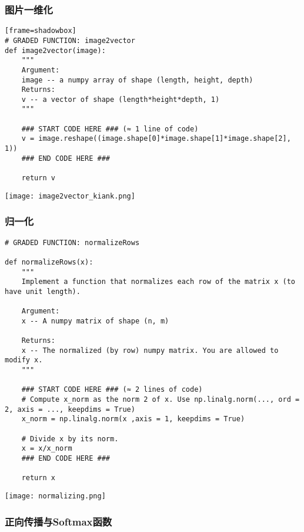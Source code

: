 \documentclass[UTF_8]{ctexart}
\begin{document}
\clearpage
\subsubsection{图片一维化}

\begin{lstlisting}[title=Image 2 Vector][frame=shadowbox]
# GRADED FUNCTION: image2vector
def image2vector(image):
    """
    Argument:
    image -- a numpy array of shape (length, height, depth)
    Returns:
    v -- a vector of shape (length*height*depth, 1)
    """
    
    ### START CODE HERE ### (≈ 1 line of code)
    v = image.reshape((image.shape[0]*image.shape[1]*image.shape[2], 1))
    ### END CODE HERE ###
    
    return v
\end{lstlisting}
\centering
\texttt{[image: image2vector\_kiank.png]}

\clearpage
\subsubsection{归一化}
\begin{lstlisting}[frame=shadowbox]
# GRADED FUNCTION: normalizeRows

def normalizeRows(x):
    """
    Implement a function that normalizes each row of the matrix x (to have unit length).
    
    Argument:
    x -- A numpy matrix of shape (n, m)
    
    Returns:
    x -- The normalized (by row) numpy matrix. You are allowed to modify x.
    """
    
    ### START CODE HERE ### (≈ 2 lines of code)
    # Compute x_norm as the norm 2 of x. Use np.linalg.norm(..., ord = 2, axis = ..., keepdims = True)
    x_norm = np.linalg.norm(x ,axis = 1, keepdims = True)
    
    # Divide x by its norm.
    x = x/x_norm
    ### END CODE HERE ###

    return x
\end{lstlisting}
\centering
\texttt{[image: normalizing.png]}

\clearpage
\subsubsection{正向传播与Softmax函数}
\end{document}
